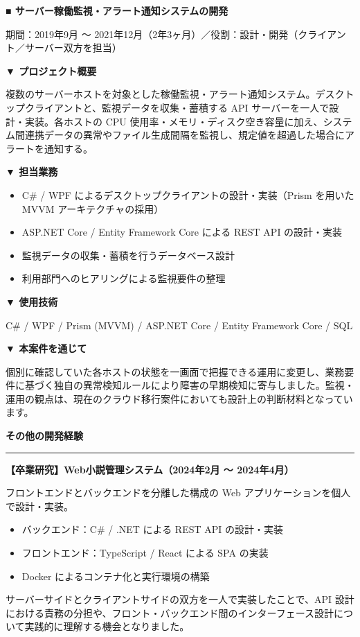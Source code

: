 \documentclass[paper=a4paper,fontsize=10pt,head_space=18mm,foot_space=15mm,gutter=15mm,fore_edge=15mm,baselineskip=16pt]{jlreq}
\newcommand{\kyariku}[1]{%
  \par\vspace{10pt}%
  {\Large\bfseries #1}\par\vspace{4pt}%
  {\color{gray}\rule{\textwidth}{0.4pt}}\par\vspace{6pt}%
}
\newcommand{\project}[1]{%
  \par\vspace{6pt}%
  {\large\bfseries #1}\par\vspace{2pt}%
}
\begin{document}
\project{■ サーバー稼働監視・アラート通知システムの開発}
期間：2019年9月 〜 2021年12月（2年3ヶ月）／役割：設計・開発（クライアント／サーバー双方を担当）

\textbf{▼ プロジェクト概要}\par
複数のサーバーホストを対象とした稼働監視・アラート通知システム。デスクトップクライアントと、監視データを収集・蓄積する API サーバーを一人で設計・実装。各ホストの CPU 使用率・メモリ・ディスク空き容量に加え、システム間連携データの異常やファイル生成間隔を監視し、規定値を超過した場合にアラートを通知する。

\textbf{▼ 担当業務}
\begin{itemize}
  \item C\# / WPF によるデスクトップクライアントの設計・実装（Prism を用いた MVVM アーキテクチャの採用）
  \item ASP.NET Core / Entity Framework Core による REST API の設計・実装
  \item 監視データの収集・蓄積を行うデータベース設計
  \item 利用部門へのヒアリングによる監視要件の整理
\end{itemize}

\textbf{▼ 使用技術}\par
C\# / WPF / Prism (MVVM) / ASP.NET Core / Entity Framework Core / SQL

\textbf{▼ 本案件を通じて}\par
個別に確認していた各ホストの状態を一画面で把握できる運用に変更し、業務要件に基づく独自の異常検知ルールにより障害の早期検知に寄与しました。監視・運用の観点は、現在のクラウド移行案件においても設計上の判断材料となっています。

\kyariku{その他の開発経験}

\project{【卒業研究】Web小説管理システム（2024年2月 〜 2024年4月）}
フロントエンドとバックエンドを分離した構成の Web アプリケーションを個人で設計・実装。
\begin{itemize}
  \item バックエンド：C\# / .NET による REST API の設計・実装
  \item フロントエンド：TypeScript / React による SPA の実装
  \item Docker によるコンテナ化と実行環境の構築
\end{itemize}
サーバーサイドとクライアントサイドの双方を一人で実装したことで、API 設計における責務の分担や、フロント・バックエンド間のインターフェース設計について実践的に理解する機会となりました。
\end{document}
